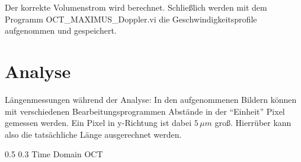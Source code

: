 \documentclass[german, %
parskip=full, %
bibliography=totoc, %
]{scrartcl}
\makeatletter
\renewcommand\subsection{\@startsection 
   {subsection}{2}{0mm}%
   {0.5\baselineskip}%
   {0.3\baselineskip}%
   {\bfseries\sffamily\large}%
   }
\makeatother
\begin{document}
Der korrekte Volumenstrom wird berechnet. Schließlich werden mit dem Programm OCT\_MAXIMUS\_Doppler.vi die Geschwindigkeitsprofile aufgenommen und gespeichert. 

\section{Analyse}

Längenmessungen während der Analyse: In den aufgenommenen Bildern können mit verschiedenen Bearbeitungsprogrammen Abstände in der "`Einheit"' Pixel gemessen werden. Ein Pixel in y-Richtung ist dabei $5\, \mu m$ groß. Hierrüber kann also die tatsächliche Länge ausgerechnet werden.

\subsection{Time Domain OCT}
\end{document}
